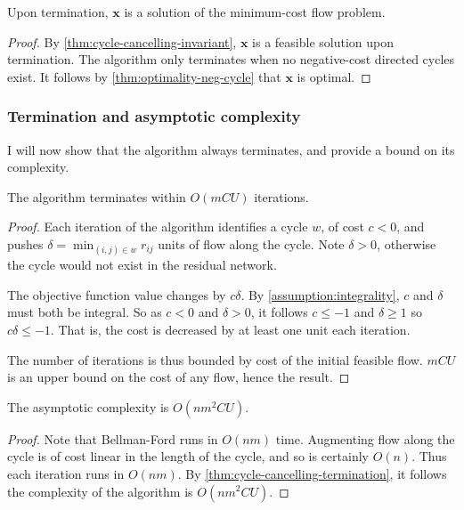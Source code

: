 \begin{cor}
Upon termination, $\mathbf{x}$ is a solution of the minimum-cost flow problem.
\end{cor}
\begin{proof}
By \cref{thm:cycle-cancelling-invariant}, $\mathbf{x}$ is a feasible solution upon termination. The algorithm only terminates when no negative-cost directed cycles exist. It follows by \cref{thm:optimality-neg-cycle} that $\mathbf{x}$ is optimal.
\end{proof}

\subsubsection{Termination and asymptotic complexity}

I will now show that the algorithm always terminates, and provide a bound on its complexity.\\

\begin{thm} \label{thm:cycle-cancelling-termination}
The algorithm terminates within $O(mCU)$ iterations\footnotemark.
\end{thm}
\begin{proof}
Each iteration of the algorithm identifies a cycle $w$, of cost $c < 0$, and pushes $\delta = \min_{(i,j) \in w} r_{ij}$ units of flow along the cycle. Note $\delta > 0$, otherwise the cycle would not exist in the residual network. 

The objective function value changes by $c\delta$.  By \cref{assumption:integrality}, $c$ and $\delta$ must both be integral. So as $c < 0$ and $\delta > 0$, it follows $c \leq -1$ and $\delta \geq 1$ so $c\delta \leq -1$. That is, the cost is decreased by at least one unit each iteration.

The number of iterations is thus bounded by cost of the initial feasible flow. $mCU$ is an upper bound on the cost of any flow, hence the result.
\end{proof}

\begin{cor} \label{corollary:cycle-cancelling-complexity}
The asymptotic complexity is $O(nm^2CU)$.
\end{cor}
\begin{proof}
Note that Bellman-Ford runs in $O(nm)$ time. Augmenting flow along the cycle is of cost linear in the length of the cycle, and so is certainly $O(n)$. Thus each iteration runs in $O(nm)$. By \cref{thm:cycle-cancelling-termination}, it follows the complexity of the algorithm is $O(nm^2CU)$.
\end{proof}

